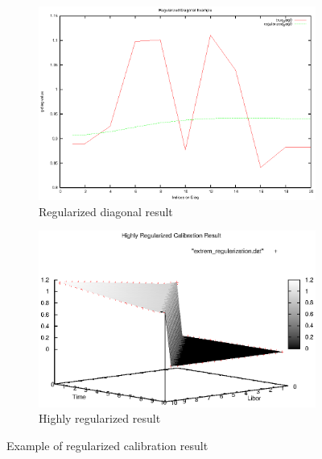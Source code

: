 \documentclass[a4paper,10pt]{article}
\begin{document}
\begin{figure}[h]
\begin{subfigure}{.5\textwidth}
  \centering
  \includegraphics[scale=0.4]{diag_compare}
  \caption{Regularized diagonal result}
  \label{fig:diag_compare}
\end{subfigure}%
\begin{subfigure}{.5\textwidth}
  \centering
  \includegraphics[scale=0.6]{extrem_regularization}
  \caption{Highly regularized result}
  \label{fig:extrem_regularization}
\end{subfigure}
\caption{Example of regularized calibration result}
\label{fig:regularized_calibration}
\end{figure}
\end{document}
